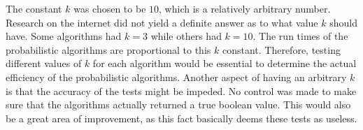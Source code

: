 \documentclass[main.tex]{subfiles}
\begin{document}
The constant $k$ was chosen to be $10$, which is a relatively arbitrary number.
Research on the internet did not yield a definite answer as to what value $k$
should have. Some algorithms had $k = 3$ while others had $k = 10$. The run
times of the probabilistic algorithms are proportional to this $k$ constant.
Therefore, testing different values of $k$ for each algorithm would be essential
to determine the actual efficiency of the probabilistic algorithms. Another
aspect of having an arbitrary $k$ is that the accuracy of the tests might be
impeded. No control was made to make sure that the algorithms actually returned
a true boolean value. This would also be a great area of improvement, as this
fact basically deems these tests as useless. \\
\end{document}
